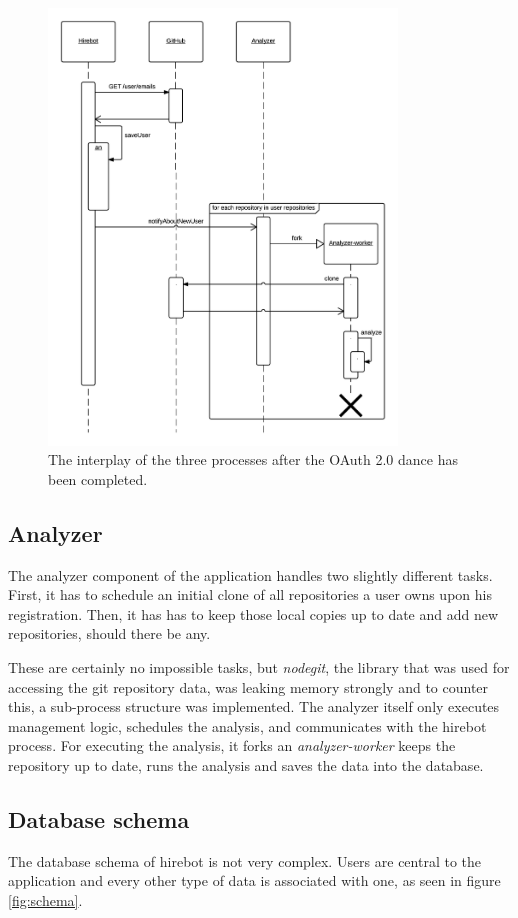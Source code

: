\begin{figure}
  \centering
  \includegraphics[width=25em]{gfx/registersequence.png}
  \caption{The interplay of the three processes after the OAuth 2.0 dance has been completed.}
  \label{fig:regprocess}
\end{figure}

\subsection{Analyzer}
The analyzer component of the application handles two slightly different
tasks. First, it has to schedule an initial clone of all repositories
a user owns upon his registration. Then, it has has to keep those local
copies up to date and add new repositories, should there be any.
\newline

These are certainly no impossible tasks, but \textit{nodegit}, the library
that was used for accessing the git repository data, was
leaking memory strongly and to counter this, a sub-process structure was
implemented. The analyzer itself only executes management logic,
schedules the analysis, and communicates with the hirebot process.
For executing the analysis, it forks an \textit{analyzer-worker}
keeps the repository up to date, runs the analysis and saves the data
into the database.

\subsection{Database schema}
The database schema of hirebot is not very complex.
Users are central to the application and every other type of data
is associated with one, as seen in figure \ref{fig:schema}.

